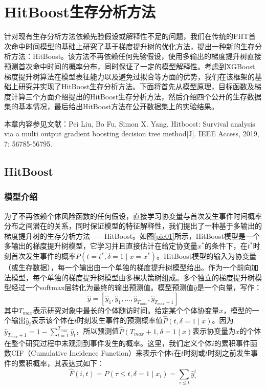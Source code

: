 
\chapter{HitBoost生存分析方法}

针对现有生存分析方法依赖先验假设或解释性不足的问题，我们在传统的FHT首次命中时间模型的基础上研究了基于梯度提升树的优化方法，提出一种新的生存分析方法：HitBoost。该方法不再依赖任何先验假设，使用多输出的梯度提升树直接预测首次命中时间的概率分布，同时保证了一定的模型解释性。考虑到XGBoost梯度提升树算法在模型表征能力以及避免过拟合等方面的优势，我们在该框架的基础上研究并实现了HitBoost生存分析方法。下面将首先从模型原理，目标函数及梯度计算三个方面介绍提出的HitBoost生存分析方法，然后介绍四个公开的生存数据集的基本情况，最后给出HitBoost方法在公开数据集上的实验结果。

本章内容参见文献：Pei Liu, Bo Fu, Simon X. Yang. Hitboost: Survival analysis via a multi­ output gradient boosting decision tree method[J]. IEEE Access, 2019, 7: 56785-­56795.

\section{HitBoost}

\subsection{模型介绍}

为了不再依赖个体风险函数的任何假设，直接学习协变量与首次发生事件时间概率分布之间潜在的关系，同时保证模型的特征解释性，我们提出了一种基于多输出的梯度提升树的生存分析方法——HitBoost。如图\ref{pic01}所示，HitBoost模型是一个多输出的梯度提升树模型，它学习并且直接估计在给定协变量$x^*$的条件下，在$t^*$时刻首次发生事件的概率$P(t = t^*,\delta = 1\mid x = x^* )$。HitBoost模型的输入为协变量（或生存数据），每一个输出由一个单独的梯度提升树模型给出。作为一个前向加法模型，每个单独的梯度提升树模型由多棵决策树组成。多个独立的梯度提升树模型经过一个softmax层转化为最终的输出预测值。模型预测值$\hat{y}$是一个向量，写作：
\begin{equation}
\hat{y}=\left[\hat{y}_1, \hat{y}_1, \dots, \hat{y}_{T_{max}}, \hat{y}_{T_{max}+1}\right] \label{F31}
\end{equation}
其中$T_{max}$表示研究对象中最长的个体随访时间。给定某个个体协变量$x$，模型的一个输出$\hat{y}_t$表示该个体在$t$时刻发生事件的预测概率值$\hat{P}(t, \delta = 1 \mid x)$。因为$\hat{y}_{T_{max}+1}=1-\sum_{t=1}^{T_{max}} \hat{y}_t$，所以预测值$\hat{P}(T_{max}+1, \delta = 1 \mid x)$表示协变量为$x$的个体在整个研究过程中未观测到事件发生的概率。这里，我们定义个体$i$的累积事件函数CIF（Cumulative Incidence Function）来表示个体$i$在$t$时刻或$t$时刻之前发生事件的累积概率，其表达式如下：
\begin{equation}
\hat{F}(i, t) = P(\tau \le t, \delta = 1 \mid x_i) = \sum_{\tau \le t} \hat{y}_{\tau}^i \label{F32}
\end{equation}


